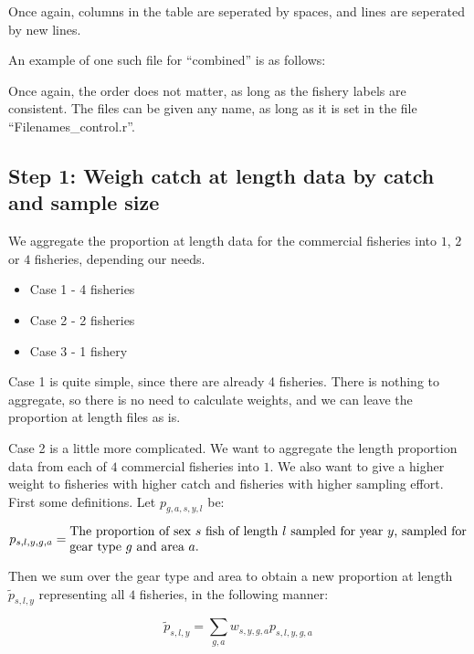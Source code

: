 \documentclass[12pt,a4paper]{article}
\begin{document}
Once again, columns in the table are seperated by spaces, and lines are seperated by new lines. 

An example of one such file for ``combined'' is as follows:



Once again, the order does not matter, as long as the fishery labels are consistent. The files can be given any name, as long as it is set in the file ``Filenames\_control.r''.


\subsection{Step 1: Weigh catch at length data by catch and sample size}

We aggregate the proportion at length data for the commercial fisheries into $1$, $2$ or $4$ fisheries, depending our needs.

\begin{itemize}
\item Case 1 - 4 fisheries
\item Case 2 - 2 fisheries
\item Case 3 - 1 fishery
\end{itemize}

Case 1 is quite simple, since there are already 4 fisheries. There is nothing to aggregate, so there is no need to calculate weights, and we can leave the proportion at length files as is.

Case 2 is a little more complicated. We want to aggregate the length proportion data from each of $4$ commercial fisheries into $1$. We also want to give a higher weight to fisheries with higher catch and fisheries with higher sampling effort. First some definitions. Let $p_{g,a,s,y,l}$ be:

\begin{equation}
p_{s,l,y,g,a} = \text{\parbox{11cm}{The proportion of sex $s$ fish of length $l$ sampled for year $y$,
                      sampled for gear type $g$ and area $a$.}}
\end{equation}

Then we sum over the gear type and area to obtain a new proportion at length $\tilde{p}_{s,l,y}$ representing all $4$ fisheries, in the following manner:

\begin{equation}
\tilde{p}_{s,l,y} = \sum_{g,a} w_{s,y,g,a} p_{s,l,y,g,a}
\end{equation}
\end{document}
